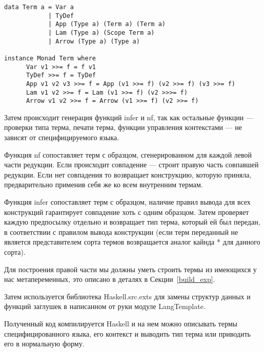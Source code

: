 \begin{lstlisting}[caption={Представление STLC и представитель класса Monad},captionpos=b, frame=single]
data Term a = Var a
            | TyDef
            | App (Type a) (Term a) (Term a)
            | Lam (Type a) (Scope Term a)
            | Arrow (Type a) (Type a)

instance Monad Term where
      Var v1 >>= f = f v1
      TyDef >>= f = TyDef
      App v1 v2 v3 >>= f = App (v1 >>= f) (v2 >>= f) (v3 >>= f)
      Lam v1 v2 >>= f = Lam (v1 >>= f) (v2 >>>= f)
      Arrow v1 v2 >>= f = Arrow (v1 >>= f) (v2 >>= f)
\end{lstlisting}

Затем происходит генерация функций infer и nf, так как остальные функции --- проверки типа терма, печати терма, функции управления контекстами --- не зависят от специфицируемого языка.

Функция nf сопоставляет терм с образцом, сгенерированном для каждой левой части редукции. Если происходит совпадение --- строит правую часть совпавшей редукции. Если нет совпадения то возвращает конструкцию, которую приняла, предварительно применив себя же ко всем внутренним термам.

Функция infer сопоставляет терм с образцом, наличие правил вывода для всех конструкций гарантирует совпадение хоть с одним образцом. Затем проверяет каждую предпосылку отдельно и возвращает тип терма, который ей был передан, в соответствии с правилом вывода конструкции (если терм переданный не является представителем сорта термов возвращается аналог кайнда * для данного сорта).

Для построения правой части мы должны уметь строить термы из имеющихся у нас метапеременных, это описано в деталях в Секции~\ref{build_exp}.

Затем используется библиотека Haskell.src.exts\cite{src_exts} для замены структур данных и функций заглушек в написанном от руки модуле LangTemplate.

Полученный код компилируется Haskell и на нем можно описывать термы специфицированного языка, его контекст и выводить тип терма или приводить его в нормальную форму.










